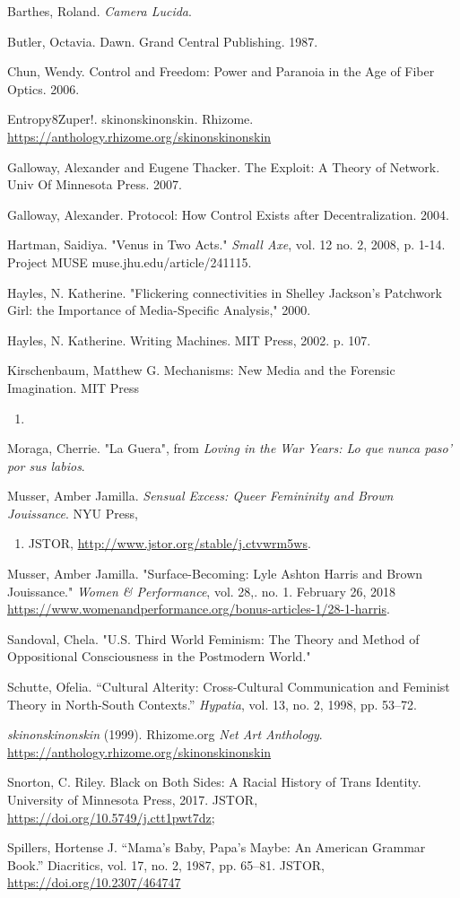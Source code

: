 \documentclass[11pt]{article}
\begin{document}
Barthes, Roland. \emph{Camera Lucida}.

Butler, Octavia. Dawn. Grand Central Publishing. 1987.

Chun, Wendy. Control and Freedom: Power and Paranoia in the Age of Fiber Optics. 2006.

Entropy8Zuper!. skinonskinonskin. Rhizome. \url{https://anthology.rhizome.org/skinonskinonskin} 

Galloway, Alexander and Eugene Thacker. The Exploit: A Theory of Network. Univ Of 
Minnesota Press. 2007. 

Galloway, Alexander. Protocol: How Control Exists after
Decentralization. 2004.

Hartman, Saidiya. "Venus in Two Acts." \emph{Small Axe}, vol. 12 no. 2,
   2008, p. 1-14. Project MUSE muse.jhu.edu/article/241115.

Hayles, N. Katherine. "Flickering connectivities in Shelley Jackson's
Patchwork Girl: the Importance of Media-Specific Analysis," 2000.

Hayles, N. Katherine. Writing Machines. MIT Press, 2002. p. 107.

Kirschenbaum, Matthew G. Mechanisms: New Media and the Forensic Imagination. MIT Press 
\begin{enumerate}
\item 
\end{enumerate}

Moraga, Cherrie. "La Guera", from \emph{Loving in the War Years: Lo que
nunca paso' por sus labios}.

Musser, Amber Jamilla. \emph{Sensual Excess: Queer Femininity and Brown
Jouissance}. NYU Press,
\begin{enumerate}
\item JSTOR, \url{http://www.jstor.org/stable/j.ctvwrm5ws}.
\end{enumerate}

Musser, Amber Jamilla. "Surface-Becoming: Lyle Ashton Harris and Brown
  Jouissance." \emph{Women \& Performance}, vol. 28,. no. 1. February 26, 2018
  \url{https://www.womenandperformance.org/bonus-articles-1/28-1-harris}. 

Sandoval, Chela. "U.S. Third World Feminism: The Theory and Method of
Oppositional Consciousness in the Postmodern World."

Schutte, Ofelia. “Cultural Alterity: Cross-Cultural Communication and
Feminist Theory in North-South Contexts.” \emph{Hypatia}, vol. 13, no. 2,
1998, pp. 53–72.

\emph{skinonskinonskin} (1999). Rhizome.org \emph{Net Art Anthology}.
\url{https://anthology.rhizome.org/skinonskinonskin}

Snorton, C. Riley. Black on Both Sides: A Racial History of Trans Identity. University of 
Minnesota Press, 2017. JSTOR, \url{https://doi.org/10.5749/j.ctt1pwt7dz};

Spillers, Hortense J. “Mama’s Baby, Papa’s Maybe: An American Grammar Book.” Diacritics, 
vol. 17, no. 2, 1987, pp. 65–81. JSTOR, \url{https://doi.org/10.2307/464747}
\end{document}
